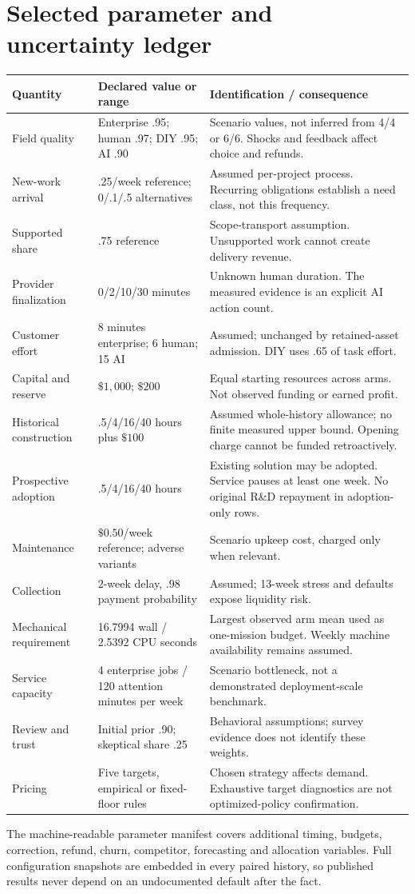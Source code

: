\documentclass[11pt,a4paper]{article}
\newcommand{\money}[1]{\(\$#1\)}
\begin{document}
\section{Selected parameter and uncertainty ledger}
\begin{longtable}{p{37mm}p{37mm}p{70mm}}
\toprule
Quantity & Declared value or range & Identification / consequence\\
\midrule
\endhead
Field quality & Enterprise .95; human .97; DIY .95; AI .90 & Scenario values, not inferred from 4/4 or 6/6. Shocks and feedback affect choice and refunds.\\
New-work arrival & .25/week reference; 0/.1/.5 alternatives & Assumed per-project process. Recurring obligations establish a need class, not this frequency.\\
Supported share & .75 reference & Scope-transport assumption. Unsupported work cannot create delivery revenue.\\
Provider finalization & 0/2/10/30 minutes & Unknown human duration. The measured evidence is an explicit AI action count.\\
Customer effort & 8 minutes enterprise; 6 human; 15 AI & Assumed; unchanged by retained-asset admission. DIY uses .65 of task effort.\\
Capital and reserve & \money{1,000}; \money{200} & Equal starting resources across arms. Not observed funding or earned profit.\\
Historical construction & .5/4/16/40 hours plus \money{100} & Assumed whole-history allowance; no finite measured upper bound. Opening charge cannot be funded retroactively.\\
Prospective adoption & .5/4/16/40 hours & Existing solution may be adopted. Service pauses at least one week. No original R\&D repayment in adoption-only rows.\\
Maintenance & \money{0.50}/week reference; adverse variants & Scenario upkeep cost, charged only when relevant.\\
Collection & 2-week delay, .98 payment probability & Assumed; 13-week stress and defaults expose liquidity risk.\\
Mechanical requirement & 16.7994 wall / 2.5392 CPU seconds & Largest observed arm mean used as one-mission budget. Weekly machine availability remains assumed.\\
Service capacity & 4 enterprise jobs / 120 attention minutes per week & Scenario bottleneck, not a demonstrated deployment-scale benchmark.\\
Review and trust & Initial prior .90; skeptical share .25 & Behavioral assumptions; survey evidence does not identify these weights.\\
Pricing & Five targets, empirical or fixed-floor rules & Chosen strategy affects demand. Exhaustive target diagnostics are not optimized-policy confirmation.\\
\bottomrule
\end{longtable}
The machine-readable parameter manifest covers additional timing, budgets, correction,
refund, churn, competitor, forecasting and allocation variables. Full configuration snapshots
are embedded in every paired history, so published results never depend on an undocumented
default after the fact.
\end{document}
